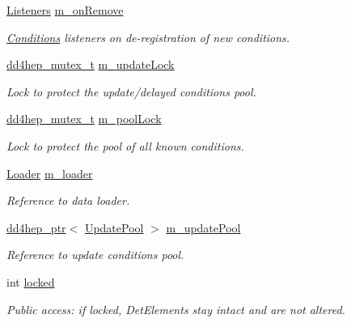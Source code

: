 \begin{DoxyCompactItemize}
\hyperlink{class_d_d4hep_1_1_conditions_1_1_conditions_manager_object_aba0162524bc90a39e30bd5f1f0067ee2}{Listeners} \hyperlink{class_d_d4hep_1_1_conditions_1_1_conditions_manager_object_aa6081a3511680ee1060e78b6a570636d}{m\_\-onRemove}
\begin{DoxyCompactList}\small\item\em \hyperlink{namespace_d_d4hep_1_1_conditions}{Conditions} listeners on de-\/registration of new conditions. \item\end{DoxyCompactList}\item 
\hyperlink{struct_d_d4hep_1_1dd4hep__mutex__t}{dd4hep\_\-mutex\_\-t} \hyperlink{class_d_d4hep_1_1_conditions_1_1_conditions_manager_object_a4da3e311e9b9121fef58f2cd80da12f9}{m\_\-updateLock}
\begin{DoxyCompactList}\small\item\em Lock to protect the update/delayed conditions pool. \item\end{DoxyCompactList}\item 
\hyperlink{struct_d_d4hep_1_1dd4hep__mutex__t}{dd4hep\_\-mutex\_\-t} \hyperlink{class_d_d4hep_1_1_conditions_1_1_conditions_manager_object_af0a0803e28ed3d30721609a420689e4a}{m\_\-poolLock}
\begin{DoxyCompactList}\small\item\em Lock to protect the pool of all known conditions. \item\end{DoxyCompactList}\item 
\hyperlink{class_d_d4hep_1_1dd4hep__ptr}{Loader} \hyperlink{class_d_d4hep_1_1_conditions_1_1_conditions_manager_object_a94483d902a20171f95eaf0e2d531f05d}{m\_\-loader}
\begin{DoxyCompactList}\small\item\em Reference to data loader. \item\end{DoxyCompactList}\item 
\hyperlink{class_d_d4hep_1_1dd4hep__ptr}{dd4hep\_\-ptr}$<$ \hyperlink{class_d_d4hep_1_1_conditions_1_1_update_pool}{UpdatePool} $>$ \hyperlink{class_d_d4hep_1_1_conditions_1_1_conditions_manager_object_a83ef3cf4c818d972d9c8720913c7525b}{m\_\-updatePool}
\begin{DoxyCompactList}\small\item\em Reference to update conditions pool. \item\end{DoxyCompactList}\item 
int \hyperlink{class_d_d4hep_1_1_conditions_1_1_conditions_manager_object_af4a66ea9d20e133cadd6e33a188d7f5b}{locked}
\begin{DoxyCompactList}\small\item\em Public access: if locked, DetElements stay intact and are not altered. \item\end{DoxyCompactList}\end{DoxyCompactItemize}
